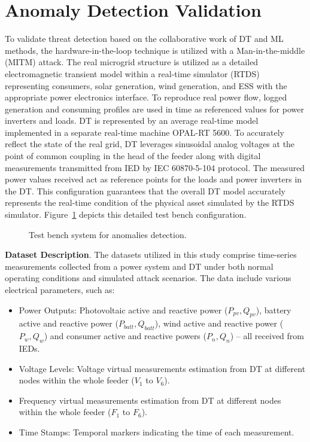 \section{Anomaly Detection Validation}\label{sec:ch4/sec5}
To validate threat detection based on the collaborative work of DT and ML methods, the hardware-in-the-loop technique is utilized with a Man-in-the-middle (MITM) attack. The real microgrid structure is utilized as a detailed electromagnetic transient model within a real-time simulator (RTDS) representing consumers, solar generation, wind generation, and ESS with the appropriate power electronics interface. To reproduce real power flow, logged generation and consuming profiles are used in time as referenced values for power inverters and loads.  DT is represented by an average real-time model implemented in a separate real-time machine OPAL-RT 5600. To accurately reflect the state of the real grid, DT leverages sinusoidal analog voltages at the point of common coupling in the head of the feeder along with digital measurements transmitted from IED by IEC 60870-5-104 protocol. The measured power values received act as reference points for the loads and power inverters in the DT. This configuration guarantees that the overall DT model accurately represents the real-time condition of the physical asset simulated by the RTDS simulator. Figure~\cref{fig:mitm_bench} depicts this detailed test bench configuration.

\begin{figure}[ht]
    \caption{Test bench system for anomalies detection.}\label{fig:mitm_bench}
\end{figure}

\textbf{Dataset Description}. The datasets utilized in this study comprise time-series measurements collected from a power system and DT under both normal operating conditions and simulated attack scenarios. The data include various electrical parameters, such as:
\begin{itemize}
    \item Power Outputs: Photovoltaic active and reactive power ($P_{pv}, Q_{pv}$), battery active and reactive power ($P_{batt}, Q_{batt}$), wind active and reactive power ($P_{w}, Q_{w}$) and consumer active and reactive powers ($P_{n}, Q_{n}$) – all received from IEDs.
    \item Voltage Levels: Voltage virtual measurements estimation from DT at different nodes within the whole feeder ($V_{1}$ to $V_{6}$).
    \item Frequency virtual measurements estimation from DT at different nodes within the whole feeder ($F_{1}$ to $F_{6}$).
    \item Time Stamps: Temporal markers indicating the time of each measurement.
\end{itemize}

